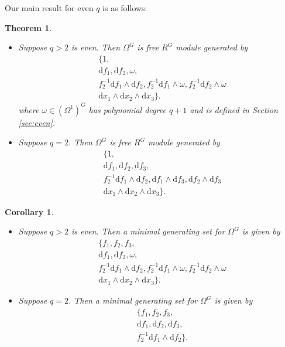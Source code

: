 \documentclass[a4paper]{amsart}
\newcommand{\dd}{\mathrm{d}}
\newtheorem{Theorem}[Lemma]{Theorem}
\newtheorem{Corollary}[Lemma]{Corollary}
\newtheorem*{Corollary of Conjecture}{Corollary of Conjecture}
\theoremstyle{definition}
\theoremstyle{remark}
\theoremstyle{Acknowledgments}
\begin{document}
Our main result for even $q$ is as follows:

\begin{Theorem}\label{even}\
\begin{itemize}
\item[(a)] Suppose $q>2$ is even. Then $\Omega^G$ is  free $R^G$ module generated by
\begin{align*}
&\{1, \\
&\dd f_1, \dd f_2, \omega, \\
&f_2^{-1}\dd f_1 \wedge \dd f_2, f_2^{-1}\dd f_1 \wedge \omega,f_2^{-1}\dd f_2 \wedge \omega\\
&\dd x_1 \wedge \dd x_2 \wedge \dd x_3\}.
\end{align*} where $\omega \in (\Omega^1)^G$ has polynomial degree $q+1$ and is defined in Section \ref{sec:even}.

\item[(b)] Suppose $q=2$. Then $\Omega^G$ is  free $R^G$ module generated by
\begin{align*}
&\{1, \\
&\dd f_1, \dd f_2, \dd f_3, \\
&f_2^{-1}\dd f_1 \wedge \dd f_2, \dd f_1 \wedge \dd f_3, \dd f_2 \wedge \dd f_3\\
&\dd x_1 \wedge \dd x_2 \wedge \dd x_3\}.
\end{align*} 
\end{itemize}
\end{Theorem}

\begin{Corollary}\label{evenmin}\
\begin{itemize}
\item[(a)] Suppose $q>2$ is even. Then a minimal generating set for $\Omega^G$ is  given by
\begin{align*}
&\{f_1, f_2, f_3, \\
&\dd f_1, \dd f_2, \omega, \\
&f_2^{-1}\dd f_1 \wedge \dd f_2, f_2^{-1}\dd f_1 \wedge \omega,f_2^{-1}\dd f_2 \wedge \omega\\
&\dd x_1 \wedge \dd x_2 \wedge \dd x_3\}.
\end{align*}

\item[(b)] Suppose $q=2$. Then a minimal generating set for $\Omega^G$ is  given by
\begin{align*}
&\{f_1, f_2, f_3, \\&\dd f_1, \dd f_2, \dd f_3, \\
&f_2^{-1}\dd f_1 \wedge \dd f_2\}.
\end{align*} 
\end{itemize}
\end{Corollary}
\end{document}
